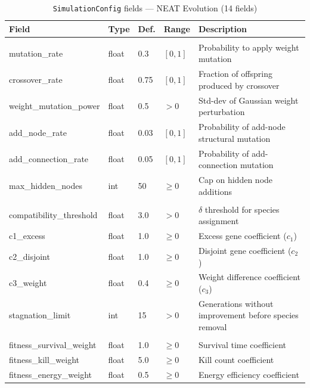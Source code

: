 \begin{table}[H]
\centering
\scriptsize
\caption{\texttt{SimulationConfig} fields — NEAT Evolution (14 fields)}
\label{tab:config2}
\begin{tabularx}{\textwidth}{@{}>{\ttfamily\scriptsize}p{6.3cm}>{\ttfamily\scriptsize}p{1.3cm}>{\scriptsize}p{1.0cm}>{\scriptsize}p{1.0cm}>{\scriptsize\RaggedRight}X@{}}
\toprule
\textbf{Field} & \textbf{Type} & \textbf{Def.} & \textbf{Range} & \textbf{Description} \\
\midrule
\multicolumn{5}{@{}l}{\textit{Mutation rates}} \\
mutation\_rate         & float  & 0.3    & $[0,1]$ & Probability to apply weight mutation \\
crossover\_rate        & float  & 0.75   & $[0,1]$ & Fraction of offspring produced by crossover \\
weight\_mutation\_power& float  & 0.5    & $>0$    & Std-dev of Gaussian weight perturbation \\
add\_node\_rate        & float  & 0.03   & $[0,1]$ & Probability of add-node structural mutation \\
add\_connection\_rate  & float  & 0.05   & $[0,1]$ & Probability of add-connection mutation \\
max\_hidden\_nodes     & int    & 50     & $\ge 0$ & Cap on hidden node additions \\
\midrule
\multicolumn{5}{@{}l}{\textit{Speciation}} \\
compatibility\_threshold& float & 3.0   & $>0$    & $\delta$ threshold for species assignment \\
c1\_excess             & float  & 1.0    & $\ge 0$ & Excess gene coefficient ($c_1$) \\
c2\_disjoint           & float  & 1.0    & $\ge 0$ & Disjoint gene coefficient ($c_2$) \\
c3\_weight             & float  & 0.4    & $\ge 0$ & Weight difference coefficient ($c_3$) \\
stagnation\_limit      & int    & 15     & $>0$    & Generations without improvement before species removal \\
\midrule
\multicolumn{5}{@{}l}{\textit{Fitness weights}} \\
fitness\_survival\_weight  & float & 1.0 & $\ge 0$ & Survival time coefficient \\
fitness\_kill\_weight      & float & 5.0 & $\ge 0$ & Kill count coefficient \\
fitness\_energy\_weight    & float & 0.5 & $\ge 0$ & Energy efficiency coefficient \\

\end{tabularx}
\end{table}
